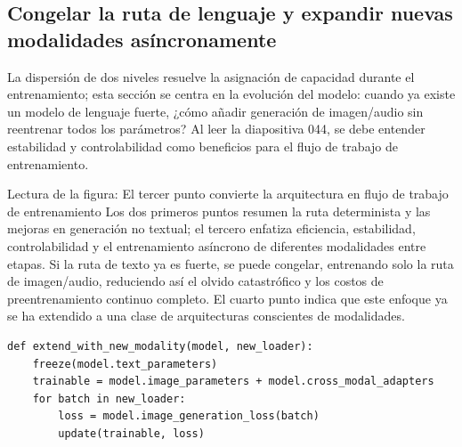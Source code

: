 
\subsection{Congelar la ruta de lenguaje y expandir nuevas modalidades asíncronamente}

La dispersión de dos niveles resuelve la asignación de capacidad durante el entrenamiento; esta sección se centra en la evolución del modelo: cuando ya existe un modelo de lenguaje fuerte, ¿cómo añadir generación de imagen/audio sin reentrenar todos los parámetros? Al leer la diapositiva 044, se debe entender estabilidad y controlabilidad como beneficios para el flujo de trabajo de entrenamiento.


\begin{knowledgebox}{Lectura de la figura: El tercer punto convierte la arquitectura en flujo de trabajo de entrenamiento}
Los dos primeros puntos resumen la ruta determinista y las mejoras en generación no textual; el tercero enfatiza eficiencia, estabilidad, controlabilidad y el entrenamiento asíncrono de diferentes modalidades entre etapas. Si la ruta de texto ya es fuerte, se puede congelar, entrenando solo la ruta de imagen/audio, reduciendo así el olvido catastrófico y los costos de preentrenamiento continuo completo. El cuarto punto indica que este enfoque ya se ha extendido a una clase de arquitecturas conscientes de modalidades.
\end{knowledgebox}

\begin{lstlisting}[caption={Congelar la ruta de lenguaje existente, expandir nueva modalidad de generación}]
def extend_with_new_modality(model, new_loader):
    freeze(model.text_parameters)
    trainable = model.image_parameters + model.cross_modal_adapters
    for batch in new_loader:
        loss = model.image_generation_loss(batch)
        update(trainable, loss)
\end{lstlisting}

